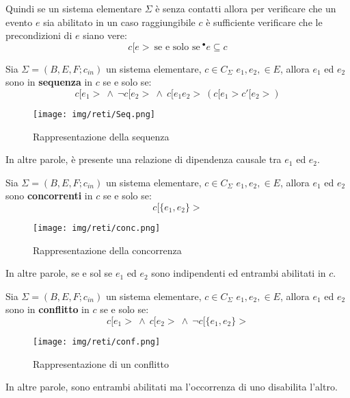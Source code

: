 Quindi se un sistema elementare $\Sigma$ è senza contatti allora per verificare
che un evento $e$ sia abilitato in un caso raggiungibile $c$ è sufficiente
verificare che le precondizioni di $e$ siano vere:
\begin{equation}
    c[e> \ \text{se e solo se} \ ^{\bullet} e \subseteq c
\end{equation}
\begin{definizione}
    Sia $\Sigma = (B, E, F; c_{in})$ un sistema elementare, $c \in C_{\Sigma}$
    $e_1, e_2, \in E$, allora $e_1$ ed $e_2$ sono in \textbf{sequenza} in $c$
    se e solo se:
    \begin{equation}
        c[e_1 > \ \land \ \lnot c[e_2 > \ \land \ c[e_1e_2 > \ (c[e_1 > c'[e_2 >)
    \end{equation}
    \begin{figure}[!ht]
        \centering
        \texttt{[image: img/reti/Seq.png]}
        \caption{Rappresentazione della sequenza}
    \end{figure}
    In altre parole, è presente una relazione di dipendenza causale tra $e_1$ ed
    $e_2$.
\end{definizione}
\begin{definizione}
    Sia $\Sigma = (B, E, F; c_{in})$ un sistema elementare, $c \in C_{\Sigma}$
    $e_1, e_2, \in E$, allora $e_1$ ed $e_2$ sono \textbf{concorrenti} in $c$
    se e solo se:
    \begin{equation}
        c[\{e_1, e_2\} >
    \end{equation}
    \begin{figure}[!ht]
        \centering
        \texttt{[image: img/reti/conc.png]}
        \caption{Rappresentazione della concorrenza}
    \end{figure}
    In altre parole, se e sol se $e_1$ ed $e_2$ sono indipendenti ed entrambi
    abilitati in $c$.
\end{definizione}
\begin{definizione}
    Sia $\Sigma = (B, E, F; c_{in})$ un sistema elementare,
    $c \in C_{\Sigma}$ $e_1, e_2, \in E$, allora $e_1$ ed $e_2$ sono in
    \textbf{conflitto} in $c$ se e solo se:
    \begin{equation}
        c[e_1 > \ \land \ c[e_2 > \ \land \ \lnot c[\{e_1, e_2\} >
    \end{equation}
    \begin{figure}[!ht]
        \centering
        \texttt{[image: img/reti/conf.png]}
        \caption{Rappresentazione di un conflitto}
    \end{figure}
    In altre parole, sono entrambi abilitati ma l'occorrenza di uno disabilita
    l'altro.
\end{definizione}
